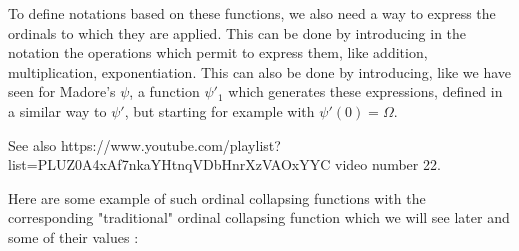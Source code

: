\documentclass[10pt]{article}
\begin{document}
To define notations based on these functions, we also need a way to express the ordinals to which they are applied. This can be done by introducing in the notation the operations which permit to express them, like addition, multiplication, exponentiation. This can also be done by introducing, like we have seen for Madore's \( \psi \), a function \( \psi'_1 \) which generates these expressions, defined in a similar way to \( \psi' \), but starting for example with \( \psi'(0) = \Omega \).

See also https://www.youtube.com/playlist?list=PLUZ0A4xAf7nkaYHtnqVDbHnrXzVAOxYYC video number 22.

\bigskip

Here are some example of such ordinal collapsing functions with the corresponding "traditional" ordinal collapsing function which we will see later and some of their values :

\bigskip
\end{document}
